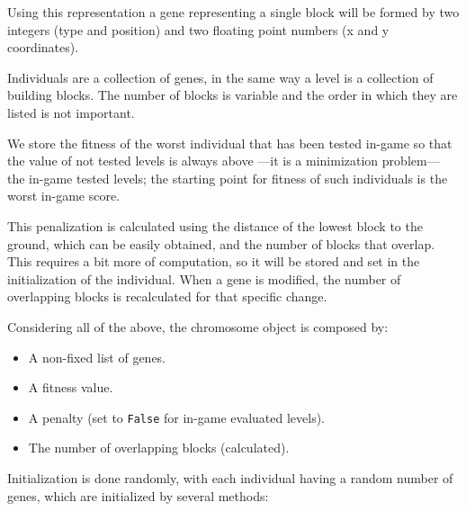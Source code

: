 \documentclass[a4paper,twoside]{article}
\begin{document}
Using this representation a gene representing a single block will be formed by two integers (type and position) and two floating point numbers (x and y coordinates).

Individuals are a collection of genes, in the same way a level is a collection 
of building blocks. The number of blocks is variable and the order in which 
they are listed is not important. 

We store the fitness of the worst individual that has been tested in-game so that the value of not tested levels is always above ---it is a minimization problem--- the in-game tested levels; the starting point for fitness of such individuals is the worst in-game score.

This penalization is calculated using the distance of the lowest block to the 
ground, which can be easily obtained, and the number of blocks that overlap. 
This requires a bit more of computation, so it will be stored and set in the 
initialization of the individual. When a gene is modified, the number of 
overlapping blocks is recalculated for that specific change.

Considering all of the above, the chromosome object is composed by:
\begin{itemize}
	\item A non-fixed list of genes.
	\item A fitness value.
	\item A penalty (set to {\tt False} for in-game evaluated levels).
	\item The number of overlapping blocks (calculated).
\end{itemize} %


Initialization is done randomly, with each individual having a random number of 
genes, which are initialized by several methods: 
\end{document}

